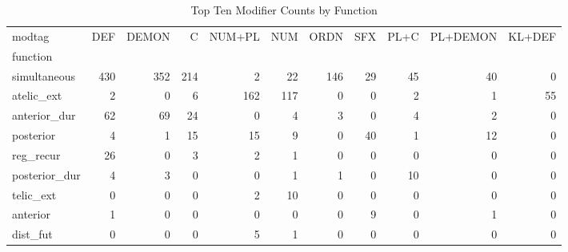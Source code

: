 \begin{table}[htbp!]
\centering
\caption{Top Ten Modifier Counts by Function}
\label{table:afmod_ct}
\begin{adjustbox}{width=1\textwidth}
\begin{tabular}{lrrrrrrrrrr}
\toprule
modtag &  DEF &  DEMON &    C &  NUM+PL &  NUM &  ORDN &  SFX &  PL+C &  PL+DEMON &  KL+DEF \\
function      &      &        &      &         &      &       &      &       &           &         \\
\midrule
simultaneous  &  430 &    352 &  214 &       2 &   22 &   146 &   29 &    45 &        40 &       0 \\
atelic\_ext    &    2 &      0 &    6 &     162 &  117 &     0 &    0 &     2 &         1 &      55 \\
anterior\_dur  &   62 &     69 &   24 &       0 &    4 &     3 &    0 &     4 &         2 &       0 \\
posterior     &    4 &      1 &   15 &      15 &    9 &     0 &   40 &     1 &        12 &       0 \\
reg\_recur     &   26 &      0 &    3 &       2 &    1 &     0 &    0 &     0 &         0 &       0 \\
posterior\_dur &    4 &      3 &    0 &       0 &    1 &     1 &    0 &    10 &         0 &       0 \\
telic\_ext     &    0 &      0 &    0 &       2 &   10 &     0 &    0 &     0 &         0 &       0 \\
anterior      &    1 &      0 &    0 &       0 &    0 &     0 &    9 &     0 &         1 &       0 \\
dist\_fut      &    0 &      0 &    0 &       5 &    1 &     0 &    0 &     0 &         0 &       0 \\
\bottomrule
\end{tabular}
\end{adjustbox}
\end{table}
